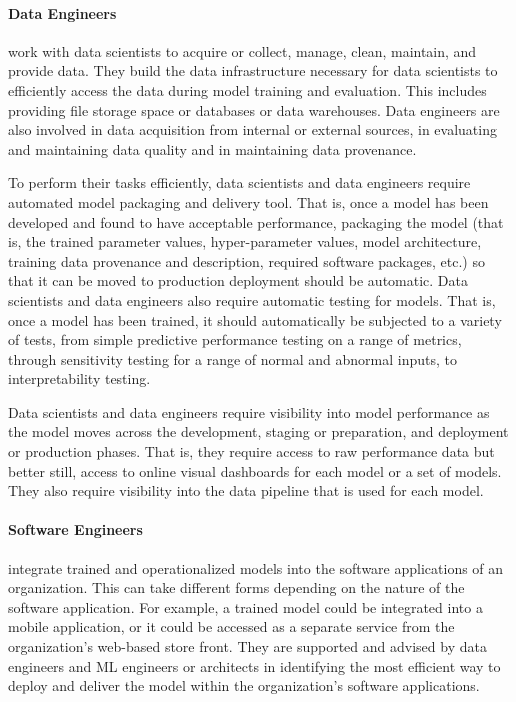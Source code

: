 \paragraph*{Data Engineers} work with data scientists to acquire or collect, manage, clean, maintain, and provide data. They build the data infrastructure necessary for data scientists to efficiently access the data during model training and evaluation. This includes providing file storage space or databases or data warehouses. Data engineers are also involved in data acquisition from internal or external sources, in evaluating and maintaining data quality and in maintaining data provenance.

To perform their tasks efficiently, data scientists and data engineers require automated model packaging and delivery tool. That is, once a model has been developed and found to have acceptable performance, packaging the model (that is, the trained parameter values, hyper-parameter values, model architecture, training data provenance and description, required software packages, etc.) so that it can be moved to production deployment should be automatic. Data scientists and data engineers also require automatic testing for models. That is, once a model has been trained, it should automatically be subjected to a variety of tests, from simple predictive performance testing on a range of metrics, through sensitivity testing for a range of normal and abnormal inputs, to interpretability testing. 

Data scientists and data engineers require visibility into model performance as the model moves across the development, staging or preparation, and deployment or production phases. That is, they require access to raw performance data but better still, access to online visual dashboards for each model or a set of models. They also require visibility into the data pipeline that is used for each model.

\paragraph*{Software Engineers} integrate trained and operationalized models into the software applications of an organization. This can take different forms depending on the nature of the software application. For example, a trained model could be integrated into a mobile application, or it could be accessed as a separate service from the organization's web-based store front. They are supported and advised by data engineers and ML engineers or architects in identifying the most efficient way to deploy and deliver the model within the organization's software applications. 


